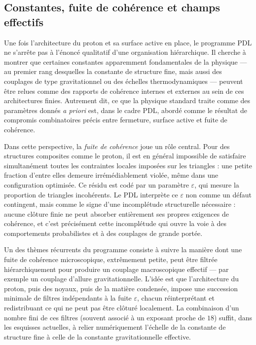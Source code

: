 \documentclass[11pt,a4paper]{article}
\theoremstyle{definition}
\begin{document}
\subsection{Constantes, fuite de cohérence et champs effectifs}

Une fois l’architecture du proton et sa surface active en place, le programme PDL ne s’arrête pas à l’énoncé qualitatif d’une organisation hiérarchique. Il cherche à montrer que certaines constantes apparemment fondamentales de la physique — au premier rang desquelles la constante de structure fine, mais aussi des couplages de type gravitationnel ou des échelles thermodynamiques — peuvent être relues comme des rapports de cohérence internes et externes au sein de ces architectures finies.\cite{Laubscher_Alpha_v2_2024,Laubscher_UniversalCoherenceLeakage_2024,Laubscher_EffectiveFields_2024} Autrement dit, ce que la physique standard traite comme des paramètres donnés \emph{a priori} est, dans le cadre PDL, abordé comme le résultat de compromis combinatoires précis entre fermeture, surface active et fuite de cohérence.

Dans cette perspective, la \emph{fuite de cohérence} joue un rôle central. Pour des structures composites comme le proton, il est en général impossible de satisfaire simultanément toutes les contraintes locales imposées sur les triangles : une petite fraction d’entre elles demeure irrémédiablement violée, même dans une configuration optimisée.\cite{Laubscher_Leakage_Probability_2024,Laubscher_Exponent18_v2_2024} Ce résidu est codé par un paramètre \(\varepsilon\), qui mesure la proportion de triangles incohérents. Le PDL interprète ce \(\varepsilon\) non comme un défaut contingent, mais comme le signe d’une incomplétude structurelle nécessaire : aucune clôture finie ne peut absorber entièrement ses propres exigences de cohérence, et c’est précisément cette incomplétude qui ouvre la voie à des comportements probabilistes et à des couplages de grande portée.

Un des thèmes récurrents du programme consiste à suivre la manière dont une fuite de cohérence microscopique, extrêmement petite, peut être filtrée hiérarchiquement pour produire un couplage macroscopique effectif — par exemple un couplage d’allure gravitationnelle.\cite{Laubscher_Exponent18_v2_2024,Laubscher_UniversalCoherenceLeakage_2024} L’idée est que l’architecture du proton, puis des noyaux, puis de la matière condensée, impose une succession minimale de filtres indépendants à la fuite \(\varepsilon\), chacun réinterprétant et redistribuant ce qui ne peut pas être clôturé localement. La combinaison d’un nombre fini de ces filtres (souvent associé à un exposant proche de \(18\)) suffit, dans les esquisses actuelles, à relier numériquement l’échelle de la constante de structure fine à celle de la constante gravitationnelle effective.
\end{document}
